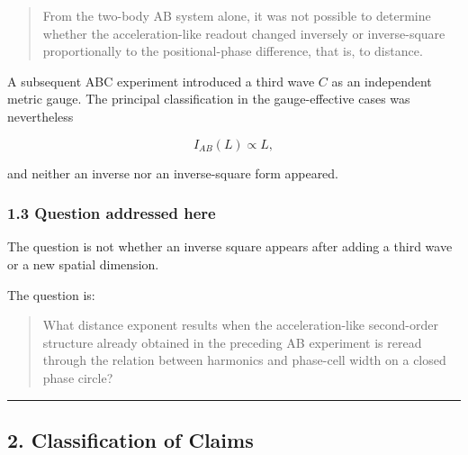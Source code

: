 \documentclass[
  10pt,
  a4paper,
]{article}
\begin{document}
\begin{quote}
From the two-body AB system alone, it was not possible to determine
whether the acceleration-like readout changed inversely or
inverse-square proportionally to the positional-phase difference, that
is, to distance.
\end{quote}

A subsequent ABC experiment introduced a third wave \(C\) as an
independent metric gauge. The principal classification in the
gauge-effective cases was nevertheless

\[
I_{AB}(L)\propto L,
\]

and neither an inverse nor an inverse-square form appeared.

\subsubsection{1.3 Question addressed
here}\label{question-addressed-here}

The question is not whether an inverse square appears after adding a
third wave or a new spatial dimension.

The question is:

\begin{quote}
What distance exponent results when the acceleration-like second-order
structure already obtained in the preceding AB experiment is reread
through the relation between harmonics and phase-cell width on a closed
phase circle?
\end{quote}

\begin{center}\rule{0.5\linewidth}{0.5pt}\end{center}

\subsection{2. Classification of Claims}\label{classification-of-claims}
\end{document}
